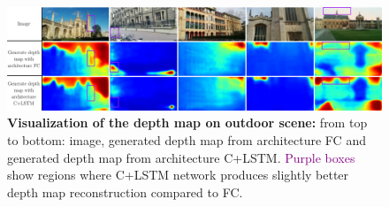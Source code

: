 \begin{landscape}
\begin{figure}
    \centering

	\includegraphics[trim={114 0 0 0},clip,width=\linewidth]{depth_maps}
	\caption[Generated outdoor depth maps]{\label{fig:depth_map_outdoor} \textbf{Visualization of the depth map on outdoor scene:} from top to bottom: image,  generated depth map from architecture FC and generated depth map from architecture C+LSTM. \textcolor{purple}{Purple boxes} show regions where C+LSTM network produces slightly better depth map reconstruction compared to FC.}
	
\end{figure}
\end{landscape}
